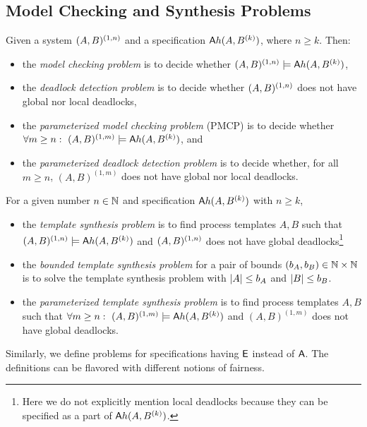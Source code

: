 \subsection{Model Checking and Synthesis Problems}
\label{gua:sec:nonparameterized_synthesis}
%
Given a system $(A,B)^{(1,n)}$ and a specification ${\operatorname{\mathsf{A}}} h(A,B^{(k)})$, where $n \ge k$. Then:
\begin{itemize}
\item the \emph{model checking problem} is to decide whether $(A,B)^{(1,n)} \models {\ensuremath{\operatorname{\mathsf{A}}}} h(A,B^{(k)})$,
\item the \emph{deadlock detection problem} is to decide whether $(A,B)^{(1,n)}$
      does not have global nor local deadlocks,
\item the \emph{parameterized model checking problem} (PMCP) is to decide whether $\forall m \ge n:\ (A,B)^{(1,m)} \models \A h(A,B^{(k)})$, and 
\item the \emph{parameterized deadlock detection problem} is to decide whether, 
      for all $m \ge n$, $(A,B)^{(1,m)}$ does not have global nor local deadlocks.
\end{itemize}
For a given number $n \in \mathbb{N}$ and specification ${\operatorname{\mathsf{A}}} h(A,B^{(k)})$ with $n \ge k$,
\begin{itemize}
\item the \emph{template synthesis problem} is to find process templates $A,B$ such that
$(A,B)^{(1,n)} \models {\ensuremath{\operatorname{\mathsf{A}}}} h(A,B^{(k)})$ and $(A,B)^{(1,n)}$ does not have global deadlocks\footnote{\label{footnote:local-deadlocks}Here we do not explicitly mention local deadlocks because they can be specified as a part of ${\operatorname{\mathsf{A}}} h(A,B^{(k)})$.}
\item 
the \emph{bounded template synthesis problem} for a pair of bounds $(b_A,b_B) \in \mathbb{N} \times \mathbb{N}$ 
is to solve the template synthesis problem with
$\left| {A} \right| \leq b_A$ and $\left| {B} \right| \leq b_B$.
\item the \emph{parameterized template synthesis problem} is to find process templates $A,B$ such that $\forall m \ge n:\ (A,B)^{(1,m)} \models \A h(A,B^{(k)})$ and $(A,B)^{(1,m)}$ does not have global deadlocks.
\end{itemize}
Similarly, we define problems for specifications having ${\operatorname{\mathsf{E}}}$ instead of ${\operatorname{\mathsf{A}}}$.
The definitions can be flavored with different notions of fairness.
